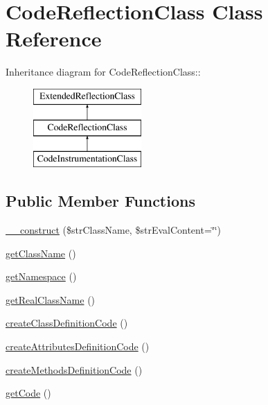 \hypertarget{class_code_reflection_class}{
\section{CodeReflectionClass Class Reference}
\label{class_code_reflection_class}
}
Inheritance diagram for CodeReflectionClass::\begin{figure}[H]
\begin{center}
\leavevmode
\includegraphics[height=3cm]{class_code_reflection_class}
\end{center}
\end{figure}
\subsection*{Public Member Functions}
\begin{CompactItemize}
\item 
\hyperlink{class_code_reflection_class_4df49469648d1e8de92c18bb8ac40b1b}{\_\-\_\-construct} (\$strClassName, \$strEvalContent=\char`\"{}\char`\"{})
\item 
\hyperlink{class_code_reflection_class_b8f8ee56588ebf5091c288e44ebdfaf4}{getClassName} ()
\item 
\hyperlink{class_code_reflection_class_2614df64646ac71b70b1e1074258052b}{getNamespace} ()
\item 
\hyperlink{class_code_reflection_class_a56c2962a9dd11f78bdafb688f9cd8fa}{getRealClassName} ()
\item 
\hyperlink{class_code_reflection_class_98b016c8a77c458803bb6905c89c914b}{createClassDefinitionCode} ()
\item 
\hyperlink{class_code_reflection_class_72b25801f6d2c909af2ee16b2b51ab8f}{createAttributesDefinitionCode} ()
\item 
\hyperlink{class_code_reflection_class_c2d23f8614e24561b794d5031001eaf8}{createMethodsDefinitionCode} ()
\item 
\hyperlink{class_code_reflection_class_b5e24da53b4a0d0848b18c1e832f47ff}{getCode} ()
\end{CompactItemize}
